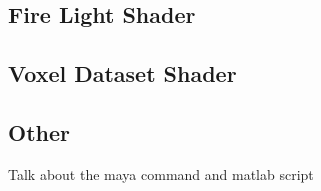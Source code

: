 \subsection{Fire Light Shader}
\label{sec:fire_light_shader}


\subsection{Voxel Dataset Shader}
\label{sec:voxel_dataset_shader}

\subsection{Other}
\label{sec:other}

Talk about the maya command and matlab script